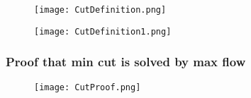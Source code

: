 \begin{figure}[!ht]
    \centering
    \texttt{[image: CutDefinition.png]}
\end{figure}
\FloatBarrier

\begin{figure}[!ht]
    \centering
    \texttt{[image: CutDefinition1.png]}
\end{figure}
\FloatBarrier

\subsubsection{Proof that min cut is solved by max flow}

\begin{figure}[!ht]
    \centering
    \texttt{[image: CutProof.png]}
\end{figure}
\FloatBarrier
